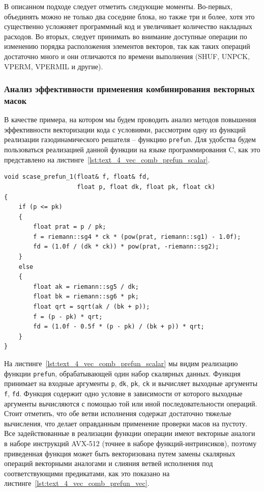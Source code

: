 В описанном подходе следует отметить следующие моменты.
Во-первых, объединять можно не только два соседние блока, но также три и более, хотя это существенно усложняет программный код и увеличивает количество накладных расходов.
Во вторых, следует принимать во внимание доступные операции по изменению порядка расположения элементов векторов, так как таких операций достаточно много и они отличаются по времени выполнения (SHUF, UNPCK, VPERM, VPERMIL и другие).

\subsubsection{Анализ эффективности применения комбинирования векторных масок}\label{sec:text_4_comb_mask_analyze}

В качестве примера, на котором мы будем проводить анализ методов повышения эффективности векторизации кода с условиями, рассмотрим одну из функций реализации газодинамического решателя -- функцию \texttt{prefun}.
Для удобства будем пользоваться реализацией данной функции на языке программирования C, как это представлено на листинге~\ref{lst:text_4_vec_comb_prefun_scalar}.

\begin{lstlisting}[caption={Скалярная версия функции \texttt{prefun} из состава римановского решателя.},label={lst:text_4_vec_comb_prefun_scalar}]
void scase_prefun_1(float& f, float& fd,
                    float p, float dk, float pk, float ck)
{
    if (p <= pk)
    {
        float prat = p / pk;
        f = riemann::sg4 * ck * (pow(prat, riemann::sg1) - 1.0f);
        fd = (1.0f / (dk * ck)) * pow(prat, -riemann::sg2);
    }
    else
    {
        float ak = riemann::sg5 / dk;
        float bk = riemann::sg6 * pk;
        float qrt = sqrt(ak / (bk + p));
        f = (p - pk) * qrt;
        fd = (1.0f - 0.5f * (p - pk) / (bk + p)) * qrt;
    }
}
\end{lstlisting}

На листинге~\ref{lst:text_4_vec_comb_prefun_scalar} мы видим реализацию функции \texttt{prefun}, обрабатывающей один набор скалярных данных.
Функция принимает на входные аргументы \texttt{p}, \texttt{dk}, \texttt{pk}, \texttt{ck} и вычисляет выходные аргументы \texttt{f}, \texttt{fd}.
Функция содержит одно условие в зависимости от которого выходные аргументы вычисляются с помощью той или иной последовательности операций.
Стоит отметить, что обе ветви исполнения содержат достаточно тяжелые вычисления, что делает оправданным применение проверки масов на пустоту.
Все задействованные в реализации функции операции имеют векторные аналоги в наборе инструкций AVX-512 (точнее в наборе функций-интринсиков), поэтому приведенная функция может быть векторизована путем замены скалярных операций векторными аналогами и слияния ветвей исполнения под соответствующими предикатами, как это показано на листинге~\ref{lst:text_4_vec_comb_prefun_vec}.

